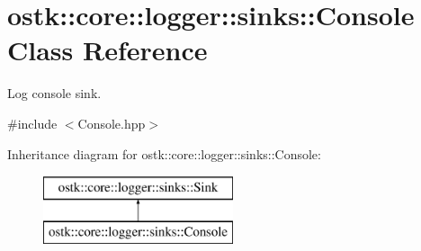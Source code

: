 \hypertarget{classostk_1_1core_1_1logger_1_1sinks_1_1_console}{}\section{ostk\+:\+:core\+:\+:logger\+:\+:sinks\+:\+:Console Class Reference}
\label{classostk_1_1core_1_1logger_1_1sinks_1_1_console}


Log console sink.  




{\ttfamily \#include $<$Console.\+hpp$>$}

Inheritance diagram for ostk\+:\+:core\+:\+:logger\+:\+:sinks\+:\+:Console\+:\begin{figure}[H]
\begin{center}
\leavevmode
\includegraphics[height=2.000000cm]{classostk_1_1core_1_1logger_1_1sinks_1_1_console}
\end{center}
\end{figure}
